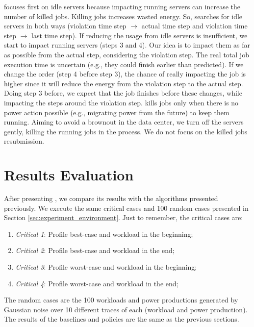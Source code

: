 \emph{\systemName} focuses first on idle servers because impacting running servers can increase the number of killed jobs. Killing jobs increases wasted energy. So, \emph{\systemName} searches for idle servers in both ways (violation time step $\rightarrow$ actual time step and violation time step $\rightarrow$ last time step). If reducing the usage from idle servers is insufficient, we start to impact running servers (steps 3 and 4). Our idea is to impact them as far as possible from the actual step, considering the violation step. The real total job execution time is uncertain (e.g., they could finish earlier than predicted). If we change the order (step 4 before step 3), the chance of really impacting the job is higher since it will reduce the energy from the violation step to the actual step. Doing step 3 before, we expect that the job finishes before these changes, while impacting the steps around the violation step. \emph{\systemName} kills jobs only when there is no power action possible (e.g., migrating power from the future) to keep them running. Aiming to avoid a brownout in the data center, we turn off the servers gently, killing the running jobs in the process. We do not focus on the killed jobs resubmission.

\section{Results Evaluation}

After presenting \emph{\systemName}, we compare its results with the algorithms presented previously. We execute the same critical cases and 100 random cases presented in Section \ref{sec:experiment_environment}. Just to remember, the critical cases are:
\begin{enumerate}
    \item \emph{Critical 1}: Profile best-case and workload in the beginning;
    \item \emph{Critical 2}: Profile best-case and workload in the end;
    \item \emph{Critical 3}: Profile worst-case and workload in the beginning;
    \item \emph{Critical 4}: Profile worst-case and workload in the end;
\end{enumerate}

The random cases are the 100 workloads and power productions generated by Gaussian noise over 10 different traces of each (workload and power production). The results of the baselines and policies are the same as the previous sections.

